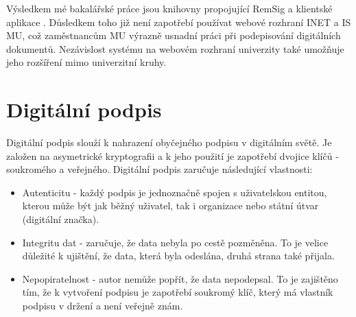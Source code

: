 \documentclass[]{fithesis3}
\begin{document}
Výsledkem mé bakalářské práce jsou knihovny propojující RemSig a klientské aplikace . Důsledkem toho již není zapotřebí používat webové rozhraní INET a IS MU, což zaměstnancům MU výrazně usnadní práci při podepisování digitálních dokumentů. Nezávislost systému na webovém rozhraní univerzity také umožňuje jeho rozšíření mimo univerzitní kruhy.


\chapter{Digitální podpis}

Digitální podpis slouží k nahrazení obyčejného podpisu v digitálním světě. Je založen na asymetrické kryptografii a k jeho použití je zapotřebí dvojice klíčů - soukromého a veřejného. Digitální podpis zaručuje následující vlastnosti:
\begin{itemize}
\item Autenticitu - každý podpis je jednoznačně spojen s uživatelskou entitou, kterou může být jak běžný uživatel, tak i organizace nebo státní útvar (digitální značka).
\item Integritu dat - zaručuje, že data nebyla po cestě pozměněna. To je velice důležité k ujištění, že data, která byla odeslána, druhá strana také přijala.
\item Nepopiratelnost - autor nemůže popřít, že data nepodepsal. To je zajištěno tím, že k vytvoření podpisu je zapotřebí soukromý klíč, který má vlastník podpisu v držení a není veřejně znám.
\end{itemize} 
\end{document}
